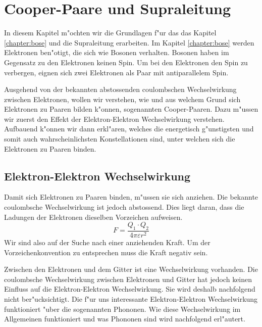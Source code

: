 \chapter{Cooper-Paare und Supraleitung\label{chapter:supraleitung}}
\begin{refsection}

In diesem Kapitel m"ochten wir die Grundlagen f"ur das das Kapitel \ref{chapter:bose} und
die Supraleitung erarbeiten. Im Kapitel \ref{chapter:bose} werden Elektronen ben"otigt,
die sich wie Bosonen verhalten. Bosonen haben im Gegensatz zu den Elektronen
keinen Spin. Um bei den Elektronen den Spin zu verbergen, eignen sich zwei Elektronen als Paar mit
antiparallelem Spin.

Ausgehend von der bekannten abstossenden coulombschen Wechselwirkung zwischen Elektronen,
wollen wir verstehen, wie und aus welchem Grund sich Elektronen zu Paaren bilden k"onnen,
sogenannten Cooper-Paaren.
Dazu m"ussen wir zuerst den Effekt der Elektron-Elektron Wechselwirkung verstehen.
Aufbauend k"onnen wir dann erkl"aren, welches die energetisch g"unstigsten und somit auch
wahrscheinlichsten Konstellationen sind, unter welchen sich die Elektronen zu Paaren binden.

\section{Elektron-Elektron Wechselwirkung\label{supraleitung:elektronelektronwechselwirkung}}
Damit sich Elektronen zu Paaren binden, m"ussen sie sich anziehen.
Die bekannte coulombsche Wechselwirkung ist jedoch abstossend.
Dies liegt daran, dass die Ladungen der Elektronen dieselben Vorzeichen aufweisen.
\begin{equation}
F = \frac{Q_1\cdot Q_2}{4\pi \varepsilon r^2}
\label{supraleitung:Coulomb}
\end{equation}
Wir sind also auf der Suche nach einer anziehenden Kraft.
Um der Vorzeichenkonvention zu entsprechen muss die Kraft negativ sein.

Zwischen den Elektronen und dem Gitter ist eine Wechselwirkung vorhanden.
Die coulombsche Wechselwirkung zwischen Elektronen und Gitter hat jedoch keinen Einfluss auf die
Elektron-Elektron Wechselwirkung.
Sie wird deshalb nachfolgend nicht ber"ucksichtigt.
Die f"ur uns interessante Elektron-Elektron Wechselwirkung funktioniert "uber die sogenannten Phononen.
Wie diese Wechselwirkung im Allgemeinen funktioniert und was Phononen sind wird nachfolgend erl"autert.


\end{refsection}
